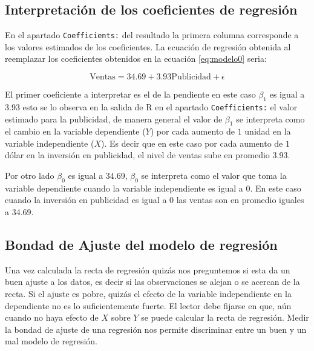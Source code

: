 \documentclass[]{book}
\begin{document}
\hypertarget{coefregre}{%
\subsection{Interpretación de los coeficientes de regresión}\label{coefregre}}

En el apartado \texttt{Coefficients:} del resultado la primera columna corresponde a los valores estimados de los coeficientes. La ecuación de regresión obtenida al reemplazar los coeficientes obtenidos en la ecuación \eqref{eq:modelo0} seria:

\begin{equation}
\text{Ventas} = 34.69 + 3.93\text{Publicidad} + \epsilon 
    \label{eq:modelo}
\end{equation}

El primer coeficiente a interpretar es el de la pendiente en este caso \(\beta_1\) es igual a 3.93 esto se lo observa en la salida de R en el apartado \texttt{Coefficients:} el valor estimado para la publicidad, de manera general el valor de \(\beta_1\) se interpreta como el cambio en la variable dependiente (\(Y\)) por cada aumento de \(1\) unidad en la variable independiente (\(X\)). Es decir que en este caso por cada aumento de \(1\) dólar en la inversión en publicidad, el nivel de ventas sube en promedio 3.93.

Por otro lado \(\beta_0\) es igual a 34.69, \(\beta_0\) se interpreta como el valor que toma la variable dependiente cuando la variable independiente es igual a \(0\). En este caso cuando la inversión en publicidad es igual a \(0\) las ventas son en promedio iguales a 34.69.

\hypertarget{bondad-de-ajuste-del-modelo-de-regresion}{%
\subsection{Bondad de Ajuste del modelo de regresión}\label{bondad-de-ajuste-del-modelo-de-regresion}}

Una vez calculada la recta de regresión quizás nos preguntemos si esta da un buen ajuste a los datos, es decir si las observaciones se alejan o se acercan de la recta. Si el ajuste es pobre, quizás el efecto de la variable independiente en la dependiente no es lo suficientemente fuerte. El lector debe fijarse en que, aún cuando no haya efecto de \(X\) sobre \(Y\) se puede calcular la recta de regresión. Medir la bondad de ajuste de una regresión nos permite discriminar entre un buen y un mal modelo de regresión.
\end{document}

